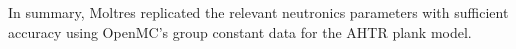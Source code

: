 In summary, Moltres replicated the relevant neutronics parameters with sufficient 
accuracy using OpenMC's group constant data for the \gls{AHTR} plank model. 


